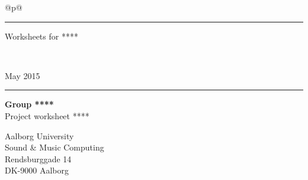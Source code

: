 \thispagestyle{empty}
\noindent%
\begin{tabular}{@{}p{\textwidth}@{}}
    \rule{\linewidth}{2mm}\vspace{1.5cm}
    \vspace*{-15mm}
    \begin{flushleft}
        \linespread{0.7}
        \fontsize{50}{60}\selectfont\sffamily
        Worksheets for
        ****
    \end{flushleft} \\[5mm] 
    \raggedright{
        \fontsize{30}{40}\selectfont\sffamily
        May 2015\\ \vspace*{1mm}
    }
    \rule{\linewidth}{.7mm}
\end{tabular}
\begin{flushleft}
  {\Huge\sffamily\bfseries
    Group ****
  }\\
  \vspace{0.2cm}
  {\LARGE\sffamily
    Project worksheet ****
  }
\end{flushleft}
\vfill
\begin{flushleft}\sffamily\large
  Aalborg University\\
  Sound \& Music Computing\\
  Rendsburggade 14\\
  DK-9000 Aalborg
\end{flushleft}
